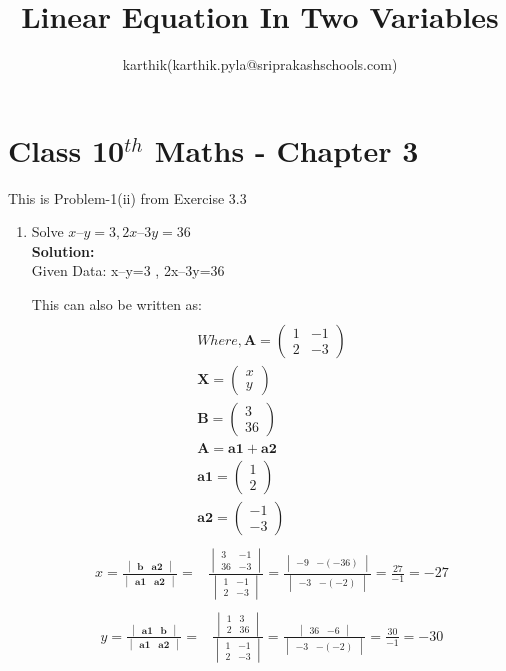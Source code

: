\documentclass[12pt]{article}
\title{Linear Equation In Two Variables}
\author{karthik(karthik.pyla@sriprakashschools.com)}
\newcommand{\myvec}[1]{\ensuremath{\begin{pmatrix}#1\end{pmatrix}}}
\newcommand{\mydet}[1]{\ensuremath{\begin{vmatrix}#1\end{vmatrix}}}
\newcommand{\solution}{\noindent \textbf{Solution: }}
\let\vec\mathbf
\begin{document}
\maketitle
\section*{Class 10$^{th}$ Maths - Chapter 3}
This is Problem-1(ii) from Exercise 3.3
\begin{enumerate}
\item  Solve $x–y=3 , 2x–3y=36$\\
\solution \\
Given Data: x–y=3 , 2x–3y=36

This can also be written as:
\begin{align}
 \\ Where, \vec{A}= \myvec{1&-1\\2&-3}\\ \vec{X}= \myvec{x\\y}\\ \vec{B}= \myvec{3\\36}
\\\vec{A} = \vec{a1}+\vec{a2}
\\\vec{a1} = \myvec{1\\2}\\ \vec{a2} = \myvec{-1\\-3}
\end{align}
\begin{align}
\\x = \frac{\mydet{\vec{b} & \vec{a2}}}{\mydet{ \vec{a1} & \vec{a2}}} =&
\frac{\mydet{ 3 & -1\\ 36 & -3}}{\mydet{1&-1\\2&-3}}= \frac{\mydet{ -9 &-(-36) }}{\mydet{ -3&-(-2) }}= \frac{27}{-1}=-27
\end{align}
\begin{align}
\\y = \frac{\mydet{ \vec{a1} & \vec{b}}}{\mydet{ \vec{a1} & \vec{a2}}} =&
\frac{\mydet{ 1 & 3 \\ 2 & 36}}{\mydet{1&-1\\2&-3}}=   \frac{\mydet{ 36 & -6}}{\mydet{ -3 & -(-2)}} = \frac{30}{-1}=-30
\end{align}
\end{enumerate}
\end{document}
